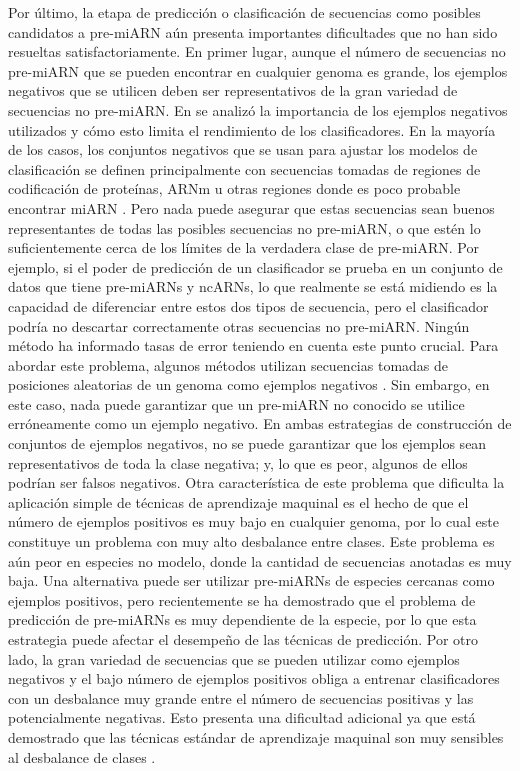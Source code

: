 Por último, la etapa de predicción o clasificación de secuencias como posibles candidatos a pre-miARN aún presenta importantes dificultades que no han sido
resueltas satisfactoriamente. En primer lugar, aunque el número de secuencias no pre-miARN que se pueden encontrar en cualquier genoma es grande, los ejemplos
negativos que se utilicen deben ser representativos de la gran variedad de secuencias no pre-miARN. En \citep{wei2014improved} se analizó la importancia de los
ejemplos negativos utilizados y cómo esto limita el rendimiento de los clasificadores. En la mayoría de los casos, los conjuntos negativos que se usan para
ajustar los modelos de clasificación se definen principalmente con secuencias tomadas de regiones de codificación de proteínas, ARNm u otras regiones donde es
poco probable encontrar miARN \citep{peace2015framework, tempel2015mirboost}. Pero nada puede asegurar que estas secuencias sean buenos representantes de todas las
posibles secuencias no pre-miARN, o que estén lo suficientemente cerca de los límites de la verdadera clase de pre-miARN. Por ejemplo, si el poder de predicción
de un clasificador se prueba en un conjunto de datos que tiene pre-miARNs y ncARNs, lo que realmente se está midiendo es la capacidad de diferenciar entre estos
dos tipos de secuencia, pero el clasificador podría no descartar correctamente otras secuencias no pre-miARN. Ningún método ha informado tasas de error teniendo
en cuenta este punto crucial. Para abordar este problema, algunos métodos utilizan secuencias tomadas de posiciones aleatorias de un genoma como ejemplos
negativos \citep{wenyuan2013training, gudys2013huntmi}. Sin embargo, en este caso, nada puede garantizar que un pre-miARN no conocido se utilice erróneamente
como un ejemplo negativo. En ambas estrategias de construcción de conjuntos de ejemplos negativos, no se puede garantizar que los ejemplos sean representativos
de toda la clase negativa; y, lo que es peor, algunos de ellos podrían ser falsos negativos. Otra característica de este problema que dificulta la aplicación
simple de técnicas de aprendizaje maquinal es el hecho de que el número de ejemplos positivos es muy bajo en cualquier genoma, por lo cual este constituye un
problema con muy alto desbalance entre clases. Este problema es aún peor en especies no modelo, donde la cantidad de secuencias anotadas es muy baja. Una
alternativa puede ser utilizar pre-miARNs de especies cercanas como ejemplos positivos, pero recientemente se ha demostrado \citep{lopes2016automatic} que el
problema de predicción de pre-miARNs es muy dependiente de la especie, por lo que esta estrategia puede afectar el desempeño de las técnicas de predicción. Por
otro lado, la gran variedad de secuencias que se pueden utilizar como ejemplos negativos y el bajo número de ejemplos positivos obliga a entrenar clasificadores
con un desbalance muy grande entre el número de secuencias positivas y las potencialmente negativas. Esto presenta una dificultad adicional ya que está
demostrado que las  técnicas estándar de aprendizaje maquinal son muy sensibles al desbalance de clases \citep{guo2008class}.

